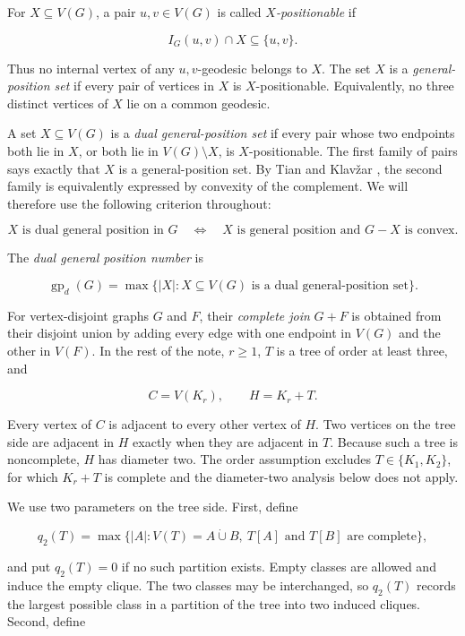 \documentclass[11pt,a4paper]{article}
\providecommand{\Needspace}[1]{}
\numberwithin{equation}{section}
\begin{document}
For \(X\subseteq V(G)\), a pair \(u,v\in V(G)\) is called
\emph{\(X\)-positionable} if

\[
I_G(u,v)\cap X\subseteq\{u,v\}.
\]

Thus no internal vertex of any \(u,v\)-geodesic belongs to \(X\). The
set \(X\) is a \emph{general-position set} if every pair of vertices in
\(X\) is \(X\)-positionable. Equivalently, no three distinct vertices of
\(X\) lie on a common geodesic.

A set \(X\subseteq V(G)\) is a \emph{dual general-position set} if every
pair whose two endpoints both lie in \(X\), or both lie in
\(V(G)\setminus X\), is \(X\)-positionable. The first family of pairs
says exactly that \(X\) is a general-position set. By Tian and Klav\v{z}ar
\cite[Theorem 3.1]{tian-klavzar-variety}, the second family is equivalently expressed by
convexity of the complement. We will therefore use the following
criterion throughout:

\nopagebreak[4]
\[
X\text{ is dual general position in }G
\quad\Longleftrightarrow\quad
X\text{ is general position and }G-X\text{ is convex}.
\]

\Needspace{6\baselineskip}
The \emph{dual general position number} is

\[
\operatorname{gp}_d(G)=
\max\{|X|:X\subseteq V(G)\text{ is a dual general-position set}\}.
\]

For vertex-disjoint graphs \(G\) and \(F\), their \emph{complete join}
\(G+F\) is obtained from their disjoint union by adding every edge with
one endpoint in \(V(G)\) and the other in \(V(F)\). In the rest of the
note, \(r\ge 1\), \(T\) is a tree of order at least three, and

\[
C=V(K_r),\qquad H=K_r+T.
\]

Every vertex of \(C\) is adjacent to every other vertex of \(H\). Two
vertices on the tree side are adjacent in \(H\) exactly when they are
adjacent in \(T\). Because such a tree is noncomplete, \(H\) has
diameter two. The order assumption excludes \(T\in\{K_1,K_2\}\), for
which \(K_r+T\) is complete and the diameter-two analysis below does not
apply.

We use two parameters on the tree side. First, define

\[
q_2(T)=\max\{|A|:V(T)=A\mathbin{\dot\cup}B,
\ T[A]\text{ and }T[B]\text{ are complete}\},
\]

and put \(q_2(T)=0\) if no such partition exists. Empty classes are
allowed and induce the empty clique. The two classes may be
interchanged, so \(q_2(T)\) records the largest possible class in a
partition of the tree into two induced cliques. Second, define
\end{document}
